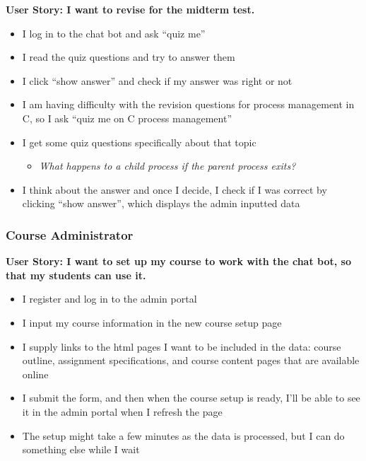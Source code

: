 \newpage
\textbf{User Story: I want to revise for the midterm test.}
\begin{itemize}
    \item{I log in to the chat bot and ask “quiz me”}
    \item{I read the quiz questions and try to answer them}
    \item{I click “show answer” and check if my answer was right or not}
    \item{I am having difficulty with the revision questions for process management in C, so I ask “quiz me on C process management”}
    \item{I get some quiz questions specifically about that topic}
    \begin{itemize}
        \item{\textit{What happens to a child process if the parent process exits?}}
    \end{itemize}
    \item{I think about the answer and once I decide, I check if I was correct by clicking “show answer”, which displays the admin inputted data}
\end{itemize}

\subsubsection{Course Administrator}
\textbf{User Story: I want to set up my course to work with the chat bot, so that my students can use it.}
\begin{itemize}
    \item{I register and log in to the admin portal}
    \item{I input my course information in the new course setup page}
    \item{I supply links to the html pages I want to be included in the data: course outline, assignment specifications, and course content pages that are available online}
    \item{I submit the form, and then when the course setup is ready, I’ll be able to see it in the admin portal when I refresh the page}
    \item{The setup might take a few minutes as the data is processed, but I can do something else while I wait}
\end{itemize}

